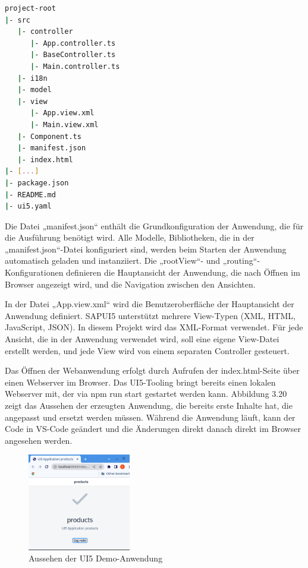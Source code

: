 \begin{lstlisting}[language=bash,  caption=Die grundlegende Projektstruktur eines SAPUI5-Projekts]
project-root
|- src
   |- controller
      |- App.controller.ts
      |- BaseController.ts
      |- Main.controller.ts
   |- i18n
   |- model
   |- view
      |- App.view.xml
      |- Main.view.xml
   |- Component.ts
   |- manifest.json
   |- index.html
|- [...]
|- package.json
|- README.md
|- ui5.yaml
\end{lstlisting}

Die Datei „manifest.json“ enthält die Grundkonfiguration der Anwendung, die für die Ausführung benötigt wird. Alle Modelle, Bibliotheken, die in der „manifest.json“-Datei konfiguriert sind, werden beim Starten der Anwendung automatisch geladen und instanziiert. Die „rootView“- und „routing“-Konfigurationen definieren die Hauptansicht der Anwendung, die nach Öffnen im Browser angezeigt wird, und die Navigation zwischen den Ansichten.

In der Datei „App.view.xml“ wird die Benutzeroberfläche der Hauptansicht der Anwendung definiert. SAPUI5 unterstützt mehrere View-Typen (XML, HTML, JavaScript, JSON). In diesem Projekt wird das XML-Format verwendet. Für jede Ansicht, die in der Anwendung verwendet wird, soll eine eigene View-Datei erstellt werden, und jede View wird von einem separaten Controller gesteuert. 

Das Öffnen der Webanwendung erfolgt durch Aufrufen der index.html-Seite   über einen Webserver im Browser.  Das UI5-Tooling bringt bereits einen lokalen Webserver mit, der via npm run start gestartet werden kann.  Abbildung 3.20 zeigt das Aussehen der erzeugten Anwendung, die bereits erste Inhalte hat, die angepasst und ersetzt werden müssen. Während die Anwendung läuft, kann der Code in VS-Code geändert und die Änderungen direkt danach direkt im Browser angesehen werden. 

\begin{figure}[htbp]
 \centering
 \includegraphics[width=0.4\textwidth]{Bilder/ui5 freestyle/3_19_ui5_demo.png}
 \caption{Aussehen der UI5 Demo-Anwendung}
\end{figure}

